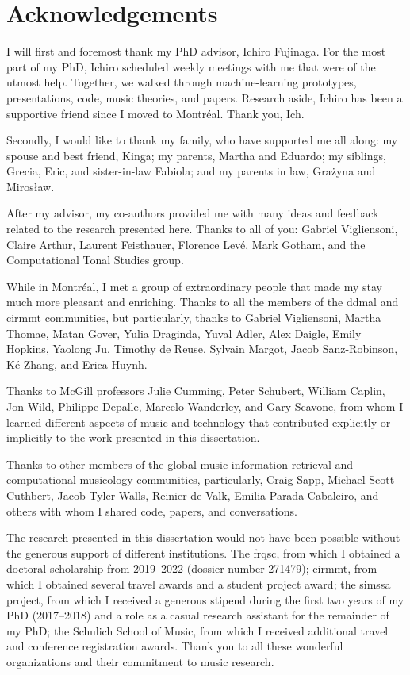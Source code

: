 \chapter*{Acknowledgements}
\label{chap:acknowledgements}

I will first and foremost thank my PhD advisor, Ichiro
Fujinaga. For the most part of my PhD, Ichiro scheduled
weekly meetings with me that were of the utmost help.
Together, we walked through machine-learning prototypes,
presentations, code, music theories, and papers. Research
aside, Ichiro has been a supportive friend since I moved to
Montr\'eal. Thank you, Ich.

Secondly, I would like to thank my family, who have
supported me all along: my spouse and best friend, Kinga; my
parents, Martha and Eduardo; my siblings, Grecia, Eric, and
sister-in-law Fabiola; and my parents in law, Gra\.zyna and
Miros\l{}aw.

After my advisor, my co-authors provided me with many ideas
and feedback related to the research presented here. Thanks
to all of you: Gabriel Vigliensoni, Claire Arthur, Laurent
Feisthauer, Florence Lev\'e, Mark Gotham, and the
Computational Tonal Studies group.

While in Montr\'eal, I met a group of extraordinary people
that made my stay much more pleasant and enriching. Thanks
to all the members of the \gls{ddmal} and \gls{cirmmt}
communities, but particularly, thanks to Gabriel
Vigliensoni, Martha Thomae, Matan Gover, Yulia Draginda,
Yuval Adler, Alex Daigle, Emily Hopkins, Yaolong Ju, Timothy
de Reuse, Sylvain Margot, Jacob Sanz-Robinson, K\'e Zhang,
and Erica Huynh.

Thanks to McGill professors Julie Cumming, Peter Schubert,
William Caplin, Jon Wild, Philippe Depalle, Marcelo
Wanderley, and Gary Scavone, from whom I learned different
aspects of music and technology that contributed explicitly
or implicitly to the work presented in this dissertation.

Thanks to other members of the global music information
retrieval and computational musicology communities,
particularly, Craig Sapp, Michael Scott Cuthbert, Jacob
Tyler Walls, Reinier de Valk, Emilia Parada-Cabaleiro, and
others with whom I shared code, papers, and conversations.

The research presented in this dissertation would not have
been possible without the generous support of different
institutions. The \gls{frqsc}, from which I obtained a
doctoral scholarship from 2019--2022 (dossier number
271479); \gls{cirmmt}, from which I obtained several travel
awards and a student project award; the \gls{simssa}
project, from which I received a generous stipend during the
first two years of my PhD (2017--2018) and a role as a
casual research assistant for the remainder of my PhD; the
Schulich School of Music, from which I received additional
travel and conference registration awards. Thank you to all
these wonderful organizations and their commitment to music
research.

